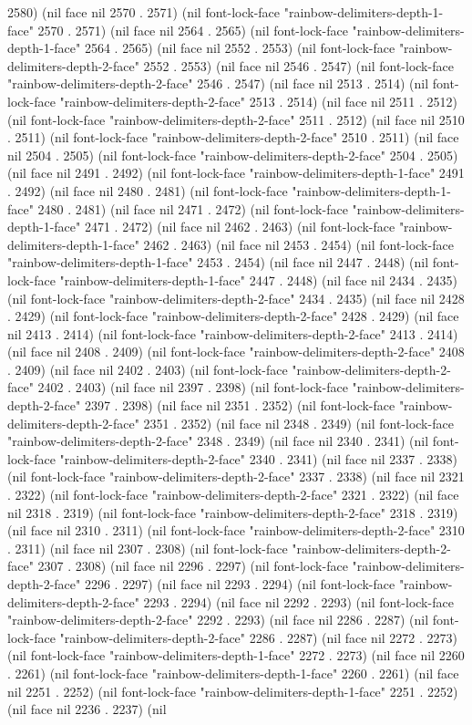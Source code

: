 2580) (nil face nil 2570 . 2571) (nil font-lock-face "rainbow-delimiters-depth-1-face" 2570 . 2571) (nil face nil 2564 . 2565) (nil font-lock-face "rainbow-delimiters-depth-1-face" 2564 . 2565) (nil face nil 2552 . 2553) (nil font-lock-face "rainbow-delimiters-depth-2-face" 2552 . 2553) (nil face nil 2546 . 2547) (nil font-lock-face "rainbow-delimiters-depth-2-face" 2546 . 2547) (nil face nil 2513 . 2514) (nil font-lock-face "rainbow-delimiters-depth-2-face" 2513 . 2514) (nil face nil 2511 . 2512) (nil font-lock-face "rainbow-delimiters-depth-2-face" 2511 . 2512) (nil face nil 2510 . 2511) (nil font-lock-face "rainbow-delimiters-depth-2-face" 2510 . 2511) (nil face nil 2504 . 2505) (nil font-lock-face "rainbow-delimiters-depth-2-face" 2504 . 2505) (nil face nil 2491 . 2492) (nil font-lock-face "rainbow-delimiters-depth-1-face" 2491 . 2492) (nil face nil 2480 . 2481) (nil font-lock-face "rainbow-delimiters-depth-1-face" 2480 . 2481) (nil face nil 2471 . 2472) (nil font-lock-face "rainbow-delimiters-depth-1-face" 2471 . 2472) (nil face nil 2462 . 2463) (nil font-lock-face "rainbow-delimiters-depth-1-face" 2462 . 2463) (nil face nil 2453 . 2454) (nil font-lock-face "rainbow-delimiters-depth-1-face" 2453 . 2454) (nil face nil 2447 . 2448) (nil font-lock-face "rainbow-delimiters-depth-1-face" 2447 . 2448) (nil face nil 2434 . 2435) (nil font-lock-face "rainbow-delimiters-depth-2-face" 2434 . 2435) (nil face nil 2428 . 2429) (nil font-lock-face "rainbow-delimiters-depth-2-face" 2428 . 2429) (nil face nil 2413 . 2414) (nil font-lock-face "rainbow-delimiters-depth-2-face" 2413 . 2414) (nil face nil 2408 . 2409) (nil font-lock-face "rainbow-delimiters-depth-2-face" 2408 . 2409) (nil face nil 2402 . 2403) (nil font-lock-face "rainbow-delimiters-depth-2-face" 2402 . 2403) (nil face nil 2397 . 2398) (nil font-lock-face "rainbow-delimiters-depth-2-face" 2397 . 2398) (nil face nil 2351 . 2352) (nil font-lock-face "rainbow-delimiters-depth-2-face" 2351 . 2352) (nil face nil 2348 . 2349) (nil font-lock-face "rainbow-delimiters-depth-2-face" 2348 . 2349) (nil face nil 2340 . 2341) (nil font-lock-face "rainbow-delimiters-depth-2-face" 2340 . 2341) (nil face nil 2337 . 2338) (nil font-lock-face "rainbow-delimiters-depth-2-face" 2337 . 2338) (nil face nil 2321 . 2322) (nil font-lock-face "rainbow-delimiters-depth-2-face" 2321 . 2322) (nil face nil 2318 . 2319) (nil font-lock-face "rainbow-delimiters-depth-2-face" 2318 . 2319) (nil face nil 2310 . 2311) (nil font-lock-face "rainbow-delimiters-depth-2-face" 2310 . 2311) (nil face nil 2307 . 2308) (nil font-lock-face "rainbow-delimiters-depth-2-face" 2307 . 2308) (nil face nil 2296 . 2297) (nil font-lock-face "rainbow-delimiters-depth-2-face" 2296 . 2297) (nil face nil 2293 . 2294) (nil font-lock-face "rainbow-delimiters-depth-2-face" 2293 . 2294) (nil face nil 2292 . 2293) (nil font-lock-face "rainbow-delimiters-depth-2-face" 2292 . 2293) (nil face nil 2286 . 2287) (nil font-lock-face "rainbow-delimiters-depth-2-face" 2286 . 2287) (nil face nil 2272 . 2273) (nil font-lock-face "rainbow-delimiters-depth-1-face" 2272 . 2273) (nil face nil 2260 . 2261) (nil font-lock-face "rainbow-delimiters-depth-1-face" 2260 . 2261) (nil face nil 2251 . 2252) (nil font-lock-face "rainbow-delimiters-depth-1-face" 2251 . 2252) (nil face nil 2236 . 2237) (nil 